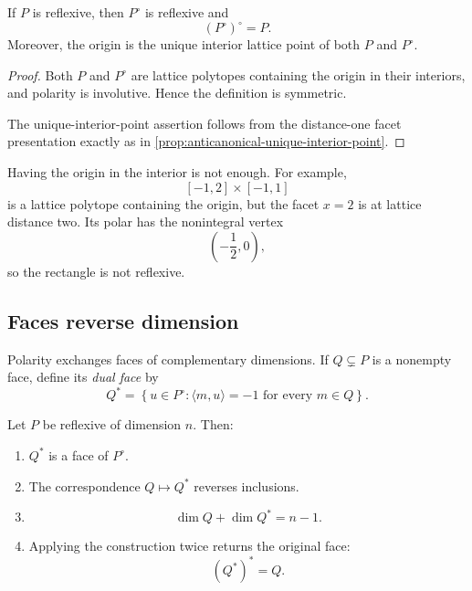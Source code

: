\begin{corollary}
\label{cor:polar-reflexive-involution}
If \(P\) is reflexive, then \(P^\circ\) is reflexive and
\[
(P^\circ)^\circ=P.
\]
Moreover, the origin is the unique interior lattice point of both
\(P\) and \(P^\circ\).
\end{corollary}

\begin{proof}
Both \(P\) and \(P^\circ\) are lattice polytopes containing the
origin in their interiors, and polarity is involutive. Hence the
definition is symmetric.

The unique-interior-point assertion follows from the distance-one
facet presentation exactly as in
\cref{prop:anticanonical-unique-interior-point}.
\end{proof}

\begin{warningbox}
Having the origin in the interior is not enough. For example,
\[
[-1,2]\times[-1,1]
\]
is a lattice polytope containing the origin, but the facet \(x=2\)
is at lattice distance two. Its polar has the nonintegral vertex
\[
\left(-\frac12,0\right),
\]
so the rectangle is not reflexive.
\end{warningbox}

\subsection{Faces reverse dimension}

Polarity exchanges faces of complementary dimensions. If
\(Q\subsetneq P\) is a nonempty face, define its \emph{dual face} by
\[
Q^*
=
\left\{
 u\in P^\circ:
 \langle m,u\rangle=-1
 \text{ for every }m\in Q
\right\}.
\]

\begin{proposition}
\label{prop:polar-face-dictionary}
Let \(P\) be reflexive of dimension \(n\). Then:

\begin{enumerate}[label=(\alph*),wide=0pt]
\item \(Q^*\) is a face of \(P^\circ\).

\item The correspondence \(Q\mapsto Q^*\) reverses inclusions.

\item
\[
\dim Q+\dim Q^*=n-1.
\]

\item Applying the construction twice returns the original face:
\[
(Q^*)^*=Q.
\]
\end{enumerate}
\end{proposition}

